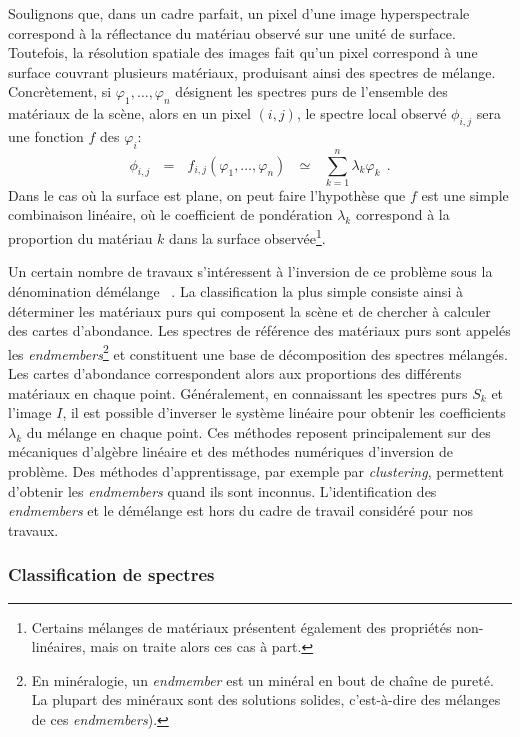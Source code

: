 Soulignons que, dans un cadre parfait, un pixel d'une image hyperspectrale correspond à la réflectance du matériau observé sur une unité de surface. Toutefois, la résolution spatiale des images fait qu'un pixel correspond à une surface couvrant plusieurs matériaux, produisant ainsi des spectres de mélange. Concrètement, si $\varphi_1, \dots, \varphi_n$ désignent les spectres purs de l'ensemble des matériaux de la scène, alors en un pixel $(i,j)$, le spectre local observé $\phi_{i,j}$ sera une fonction $f$ des $\varphi_i$:
\begin{equation}
  \phi_{i,j}~~~=~~~f_{i,j}(\varphi_1, \dots, \varphi_n)~~~\simeq~~~\sum_{k = 1}^n \lambda_k \varphi_k~~.
\end{equation}
Dans le cas où la surface est plane, on peut faire l'hypothèse que $f$ est une simple combinaison linéaire, où le coefficient de pondération $\lambda_k$ correspond à la proportion du matériau $k$ dans la surface observée\footnote{Certains mélanges de matériaux présentent également des propriétés non-linéaires, mais on traite alors ces cas à part.}.

Un certain nombre de travaux s'intéressent à l'inversion de ce problème sous la dénomination \og démélange \fg~\cite{parra_unmixing_1999}. La classification la plus simple consiste ainsi à déterminer les matériaux purs qui composent la scène et de chercher à calculer des cartes d'abondance. Les spectres de référence des matériaux purs sont appelés les \emph{endmembers}\footnote{En minéralogie, un \emph{endmember} est un minéral en bout de chaîne de pureté. La plupart des minéraux sont des solutions solides, c'est-à-dire des mélanges de ces \emph{endmembers}).} et constituent une base de décomposition des spectres mélangés. Les cartes d'abondance correspondent alors aux proportions des différents matériaux en chaque point. Généralement, en connaissant les spectres purs $S_k$ et l'image $I$, il est possible d'inverser le système linéaire pour obtenir les coefficients $\lambda_k$ du mélange en chaque point. Ces méthodes reposent principalement sur des mécaniques d'algèbre linéaire et des méthodes numériques d'inversion de problème. Des méthodes d'apprentissage, par exemple par \emph{clustering}, permettent d'obtenir les \emph{endmembers} quand ils sont inconnus. L'identification des \emph{endmembers} et le démélange est hors du cadre de travail considéré pour nos travaux.

\subsubsection{Classification de spectres}

